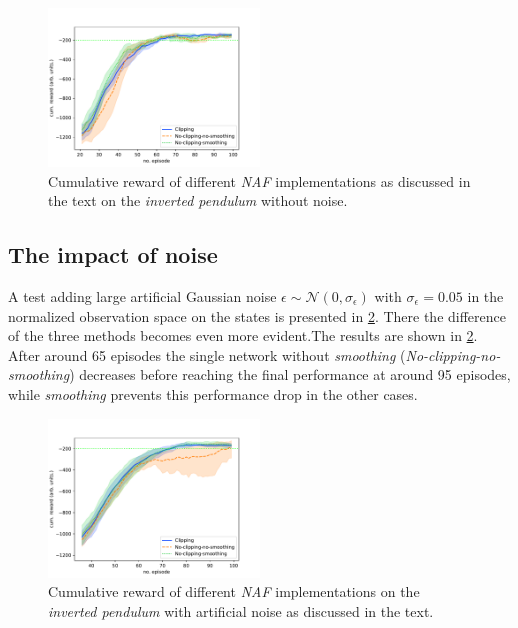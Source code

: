 \documentclass[
reprint,
amsmath,amssymb,amsfonts,clevref,
aps,
prstab,
]{revtex4-2}
\begin{document}
	\begin{figure}[!h]
	\centering
	\includegraphics*[width=0.5\textwidth]{Figures/Comparison_naf}
	\caption{Cumulative reward of different \emph{NAF} implementations as discussed in the text on the \emph{inverted pendulum} without noise.}
	\label{fig:comparsion_smoothing_small}
\end{figure}





	\subsection{The impact of noise}\label{appendix:The impact of noise}
	A test adding large artificial Gaussian noise $\epsilon \sim \mathcal{N}(0, \sigma_\epsilon)$ with $\sigma_\epsilon=0.05$ in the normalized observation space on the states is presented in \cref{fig:comparsion_noise}. There the difference of the three methods becomes even more evident.The results are shown in \cref{fig:comparsion_noise}. After around 65 episodes the single network without \emph{smoothing} (\emph{No-clipping-no-smoothing}) decreases before reaching the final performance at around 95 episodes, while  \emph{smoothing} prevents this performance drop in the other cases. 
	\begin{figure}[!h]
		\centering
		\includegraphics*[width=0.5\textwidth]{Figures/Comparison_noise}
		\caption{Cumulative reward of different \emph{NAF} implementations on the \emph{inverted pendulum} with artificial noise as discussed in the text.}
		\label{fig:comparsion_noise}
	\end{figure}
\end{document}
